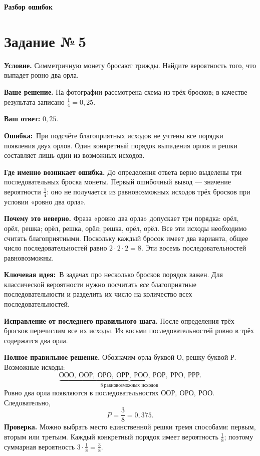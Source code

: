 \documentclass[a4paper,12pt]{article}
\newcommand{\errlabel}{\textcolor{err}{\textbf{Ошибка:}}}
\newcommand{\keylabel}{\textcolor{accent}{\textbf{Ключевая идея:}}}
\newcommand{\reviewtask}[1]{\clearpage\phantomsection\label{task:#1}\section*{\textcolor{accent}{Задание №\,#1}}}
\begin{document}
\clearpage
\thispagestyle{empty}
\vspace*{\fill}
\begin{center}
  {\LARGE\bfseries\color{accent} Разбор ошибок}
\end{center}
\vspace*{\fill}

\reviewtask{5}
\textbf{Условие.} Симметричную монету бросают трижды. Найдите вероятность того, что выпадет ровно два орла.

\textbf{Ваше решение.} На фотографии рассмотрена схема из трёх бросков; в качестве результата записано $\frac14=0{,}25$.

\textbf{Ваш ответ:} $0{,}25$.

\errlabel\ При подсчёте благоприятных исходов не учтены все порядки появления двух орлов. Один конкретный порядок выпадения орлов и решки составляет лишь один из возможных исходов.

\textbf{Где именно возникает ошибка.} До определения ответа верно выделены три последовательных броска монеты. Первый ошибочный вывод --- значение вероятности $\frac14$: оно не получается из равновозможных исходов трёх бросков при условии «ровно два орла».

\textbf{Почему это неверно.} Фраза «ровно два орла» допускает три порядка: орёл, орёл, решка; орёл, решка, орёл; решка, орёл, орёл. Все эти исходы необходимо считать благоприятными. Поскольку каждый бросок имеет два варианта, общее число последовательностей равно $2\cdot2\cdot2=8$. Эти восемь последовательностей равновозможны.

\keylabel\ В задачах про несколько бросков порядок важен. Для классической вероятности нужно посчитать \emph{все} благоприятные последовательности и разделить их число на количество всех последовательностей.

\textbf{Исправление от последнего правильного шага.} После определения трёх бросков перечислим все их исходы. Из восьми последовательностей ровно в трёх содержатся два орла.

\textbf{Полное правильное решение.} Обозначим орла буквой О, решку буквой Р. Возможные исходы:
\[
\underbrace{\text{ООО},\ \text{ООР},\ \text{ОРО},\ \text{ОРР},\
\text{РОО},\ \text{РОР},\ \text{РРО},\ \text{РРР}}_{8\ \text{равновозможных исходов}}.
\]
Ровно два орла появляются в последовательностях $\text{ООР},\ \text{ОРО},\ \text{РОО}$. Следовательно,
\[
P=\frac{3}{8}=0{,}375.
\]
\textbf{Проверка.} Можно выбрать место единственной решки тремя способами: первым, вторым или третьим. Каждый конкретный порядок имеет вероятность $\frac18$; поэтому суммарная вероятность $3\cdot\frac18=\frac38$.
\end{document}

